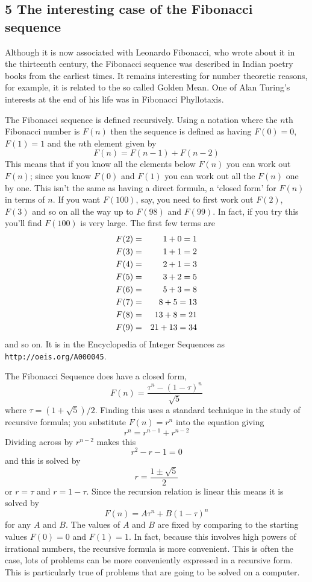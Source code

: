 \documentclass[11pt,a4paper]{scrartcl}
\begin{document}
\subsection*{5 The interesting case of the Fibonacci sequence}

Although it is now associated with Leonardo Fibonacci, who wrote about
it in the thirteenth century, the Fibonacci sequence was described in
Indian poetry books from the earliest times. It remains interesting
for number theoretic reasons, for example, it is related to the so
called Golden Mean. One of Alan Turing's interests at the end of his
life was in Fibonacci Phyllotaxis.

The Fibonacci sequence is defined recursively. Using a notation where
the $n$th Fibonacci number is $F(n)$ then the sequence is defined as
having $F(0)=0$, $F(1)=1$ and the $n$th element given by
\begin{equation}
F(n)=F(n-1)+F(n-2)
\end{equation}
This means that if you know all the elements below $F(n)$ you can work
out $F(n)$; since you know $F(0)$ and $F(1)$ you can work out all the
$F(n)$ one by one. This isn't the same as having a direct formula, a
\lq{}closed form\rq{} for $F(n)$ in terms of $n$. If you want
$F(100)$, say, you need to first work out $F(2)$, $F(3)$ and so on all
the way up to $F(98)$ and $F(99)$. In fact, if you try this you'll
find $F(100)$ is very large. The first few terms are
\begin{eqnarray}
F(2)&=&1+0=1\cr
F(3)&=&1+1=2\cr
F(4)&=&2+1=3\cr
F(5)&=&3+2=5\cr
F(6)&=&5+3=8\cr
F(7)&=&8+5=13\cr
F(8)&=&13+8=21\cr
F(9)&=&21+13=34
\end{eqnarray}
and so on. It is in the Encyclopedia of Integer Sequences as {\tt
  http://oeis.org/A000045}. 

The Fibonacci Sequence does have a closed form,
\begin{equation}
F(n)=\frac{\tau^n-(1-\tau)^n}{\sqrt{5}}
\end{equation}
where $\tau=(1+\sqrt{5})/2$. Finding this uses a standard technique in
the study of recursive formula; you substitute $F(n)=r^n$ into the
equation giving
\begin{equation}
r^n=r^{n-1}+r^{n-2}
\end{equation}
Dividing across by $r^{n-2}$ makes this
\begin{equation}
r^2-r-1=0
\end{equation}
and this is solved by
\begin{equation}
r=\frac{1\pm\sqrt{5}}{2}
\end{equation}
or $r=\tau$ and $r=1-\tau$. Since the recursion relation is linear
this means it is solved by
\begin{equation}
F(n)=A \tau^n + B (1-\tau)^n
\end{equation}
for any $A$ and $B$. The values of $A$ and $B$ are fixed by comparing
to the starting values $F(0)=0$ and $F(1)=1$. In fact, because this
involves high powers of irrational numbers, the recursive formula is
more convenient. This is often the case, lots of problems can be more
conveniently expressed in a recursive form. This is particularly true
of problems that are going to be solved on a computer.
\end{document}
